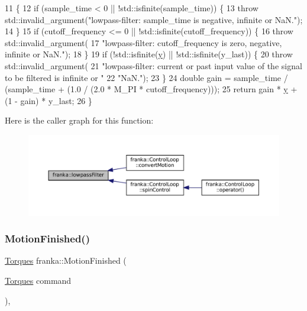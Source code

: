 \begin{DoxyCode}
11                                                                                            \{
12   \textcolor{keywordflow}{if} (sample\_time < 0 || !std::isfinite(sample\_time)) \{
13     \textcolor{keywordflow}{throw} std::invalid\_argument(\textcolor{stringliteral}{"lowpass-filter: sample\_time is negative, infinite or NaN."});
14   \}
15   \textcolor{keywordflow}{if} (cutoff\_frequency <= 0 || !std::isfinite(cutoff\_frequency)) \{
16     \textcolor{keywordflow}{throw} std::invalid\_argument(
17         \textcolor{stringliteral}{"lowpass-filter: cutoff\_frequency is zero, negative, infinite or NaN."});
18   \}
19   \textcolor{keywordflow}{if} (!std::isfinite(\hyperlink{namespaceinteractive__marker_a5e45ec67a60dd2f10e5b53a9274e4730}{y}) || !std::isfinite(y\_last)) \{
20     \textcolor{keywordflow}{throw} std::invalid\_argument(
21         \textcolor{stringliteral}{"lowpass-filter: current or past input value of the signal to be filtered is infinite or "}
22         \textcolor{stringliteral}{"NaN."});
23   \}
24   \textcolor{keywordtype}{double} gain = sample\_time / (sample\_time + (1.0 / (2.0 * M\_PI * cutoff\_frequency)));
25   \textcolor{keywordflow}{return} gain * \hyperlink{namespaceinteractive__marker_a5e45ec67a60dd2f10e5b53a9274e4730}{y} + (1 - gain) * y\_last;
26 \}
\end{DoxyCode}
Here is the caller graph for this function\+:
\nopagebreak
\begin{figure}[H]
\begin{center}
\leavevmode
\includegraphics[width=350pt]{namespacefranka_a94c21b0e87afce0147a9cd6025c239ca_icgraph}
\end{center}
\end{figure}
\mbox{\label{namespacefranka_a20791f7142d78bbbe3c957cc66a23ade}} 
\subsubsection{\texorpdfstring{Motion\+Finished()}{MotionFinished()}\hspace{0.1cm}{\footnotesize\ttfamily [1/5]}}
{\footnotesize\ttfamily \hyperlink{classfranka_1_1Torques}{Torques} franka\+::\+Motion\+Finished (\begin{DoxyParamCaption}\item[{\hyperlink{classfranka_1_1Torques}{Torques}}]{command }\end{DoxyParamCaption})\hspace{0.3cm}{\ttfamily [inline]}, {\ttfamily [noexcept]}}

